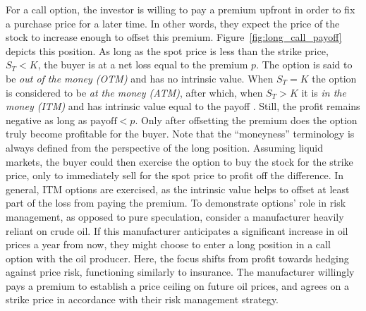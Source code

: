 \documentclass[english,12pt,a4paper,pdftex,sci,utf8]{aaltothesis}
\begin{document}
For a call option, the investor is willing to pay a premium upfront in order to fix a purchase price for a later time. In other words, they expect the price of the stock to increase enough to offset this premium. Figure~\ref{fig:long_call_payoff} depicts this position. As long as the spot price is less than the strike price, $S_T < K$, the buyer is at a net loss equal to the premium $p$. The option is said to be \emph{out of the money (OTM)} and has no intrinsic value. When $S_T = K$ the option is considered to be \emph{at the money (ATM)}, after which, when $S_T > K$ it is \emph{in the money (ITM)} and has intrinsic value equal to the payoff \cite{hull2013fundamentals}. Still, the profit remains negative as long as $\text{payoff} < p$. Only  after offsetting the premium does the option truly become profitable for the buyer. Note that the ``moneyness'' terminology is always defined from the perspective of the long position. Assuming liquid markets, the buyer could then exercise the option to buy the stock for the strike price, only to immediately sell for the spot price to profit off the difference. In general, ITM options are exercised, as the intrinsic value helps to offset at least part of the loss from paying the premium.\cite{hull2016options} To demonstrate options' role in risk management, as opposed to pure speculation, consider a manufacturer heavily reliant on crude oil. If this manufacturer anticipates a significant increase in oil prices a year from now, they might choose to enter a long position in a call option with the oil producer. Here, the focus shifts from profit towards hedging against price risk, functioning similarly to insurance. The manufacturer willingly pays a premium to establish a price ceiling on future oil prices, and agrees on a strike price in accordance with their risk management strategy.
\end{document}

